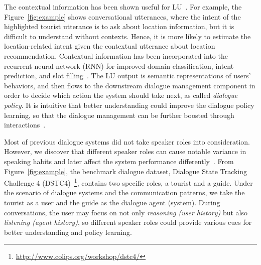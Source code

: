 \documentclass[11pt,letterpaper]{article}
\begin{document}
The contextual information has been shown useful for LU~\cite{bhargava2013easy,xu2014contextual,chen2015leveraging,sun2016an}.
For example, the Figure~\ref{fig:example} shows conversational utterances, where the intent of the highlighted tourist utterance is to ask about location information, but it is difficult to understand without contexts.
Hence, it is more likely to estimate the location-related intent given the contextual utterance about location recommendation.
Contextual information has been incorporated into the recurrent neural network (RNN) for improved domain classification, intent prediction, and slot filling~\cite{xu2014contextual,shi2015contextual,weston2015memory,chen2016end}.
The LU output is semantic representations of users' behaviors, and then flows to the downstream dialogue management component in order to decide which action the system should take next, as called \emph{dialogue policy}.
It is intuitive that better understanding could improve the dialogue policy learning, so that the dialogue management can be further boosted through interactions~\cite{li2017end}.

Most of previous dialogue systems did not take speaker roles into consideration.
However, we discover that different speaker roles can cause notable variance in speaking habits and later affect the system performance differently~\cite{chen2017dynamic}. 
From Figure~\ref{fig:example}, the benchmark dialogue dataset, Dialogue State Tracking Challenge 4 (DSTC4)~\cite{kim2016fourth}\footnote{\url{http://www.colips.org/workshop/dstc4/}}, contains two specific roles, a tourist and a guide.
Under the scenario of dialogue systems and the communication patterns, we take the tourist as a user and the guide as the dialogue agent (system).
During conversations, the user may focus on not only \emph{reasoning (user history)} but also \emph{listening (agent history)}, so different speaker roles could provide various cues for better understanding and policy learning.
\end{document}
